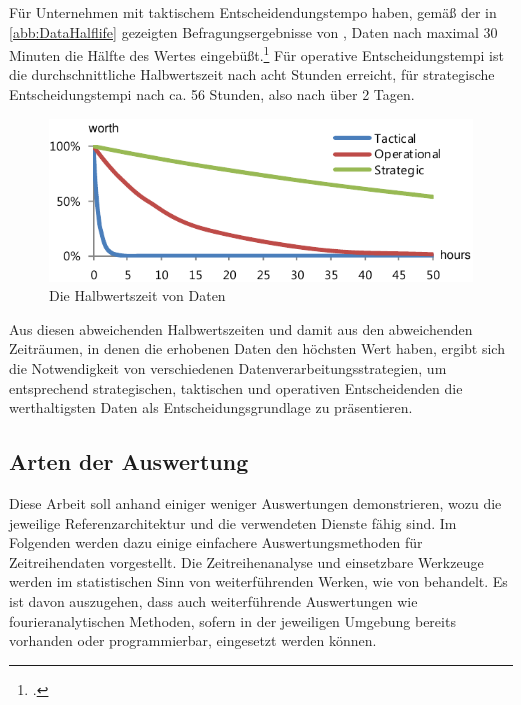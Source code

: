 Für Unternehmen mit taktischem Entscheidendungstempo haben, gemäß der in \autoref{abb:DataHalflife} gezeigten Befragungsergebnisse von \citeauthor{NucleusResarchInc..2012}, Daten nach maximal 30 Minuten die Hälfte des Wertes eingebüßt.\footcite[Vgl. auch im Folgenden][6]{NucleusResarchInc..2012} Für operative Entscheidungstempi ist die durchschnittliche Halbwertszeit nach acht Stunden erreicht, für strategische Entscheidungstempi nach ca. 56 Stunden, also nach über 2 Tagen.



\begin{figure}[H]
\centering
\includegraphics[width=\textwidth]{graphics/half-life-data.pdf}
\caption[Die Halbwertszeit von Daten]{Die Halbwertszeit von Daten\footnotemark}
\label{abb:DataHalflife}
\end{figure}
Aus diesen abweichenden Halbwertszeiten und damit aus den abweichenden Zeiträumen, in denen die erhobenen Daten den höchsten Wert haben, ergibt sich die Notwendigkeit von verschiedenen Datenverarbeitungsstrategien, um entsprechend strategischen, taktischen und operativen Entscheidenden die werthaltigsten Daten als Entscheidungsgrundlage zu präsentieren.

\subsection{Arten der Auswertung}\label{chap:auswertungsarten}
Diese Arbeit soll anhand einiger weniger Auswertungen demonstrieren, wozu die jeweilige Referenzarchitektur und die verwendeten Dienste fähig sind. Im Folgenden werden dazu einige einfachere Auswertungsmethoden für Zeitreihendaten vorgestellt. Die Zeitreihenanalyse und einsetzbare Werkzeuge werden im statistischen Sinn von weiterführenden Werken, wie von \citeauthor{Shumway.2017} behandelt. Es ist davon auszugehen, dass auch weiterführende Auswertungen wie fourieranalytischen Methoden, sofern in der jeweiligen Umgebung bereits vorhanden oder programmierbar, eingesetzt werden können.


